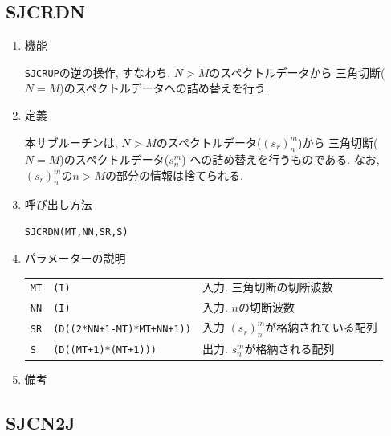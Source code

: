 \documentclass[a4j]{jarticle}
\begin{document}

\subsection{SJCRDN}

\begin{enumerate}

\item 機能

{\tt SJCRUP}の逆の操作, すなわち, $N>M$のスペクトルデータから
三角切断($N=M$)のスペクトルデータへの詰め替えを行う.


\item 定義

本サブルーチンは, 
$N>M$のスペクトルデータ($(s_r)^m_n$)から
三角切断($N=M$)のスペクトルデータ($s^m_n$)
への詰め替えを行うものである.
なお, $(s_r)^m_n$の$n>M$の部分の情報は捨てられる.

\item 呼び出し方法 
    
{\tt SJCRDN(MT,NN,SR,S)}
  
\item パラメーターの説明

\begin{tabular}{lll}
{\tt MT} & {\tt (I)} & 入力. 三角切断の切断波数\\
{\tt NN} & {\tt (I)} & 入力. $n$の切断波数\\
{\tt SR} & {\tt (D((2*NN+1-MT)*MT+NN+1))} & 入力 $(s_r)^m_n$が格納されている配列
\\
{\tt S} & {\tt (D((MT+1)*(MT+1)))} & 出力. $s^m_n$が格納される配列
\end{tabular}

\item 備考

\end{enumerate}


\subsection{SJCN2J}
\end{document}
